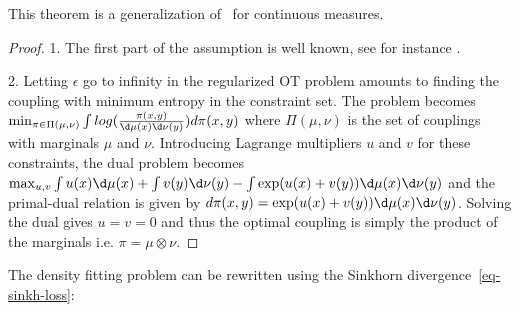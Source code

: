 \begin{rem}This theorem is a generalization of~\cite[\S3.3]{e19020047} for continuous measures. \end{rem}


\begin{proof}
1. The first part of the assumption is well known, see for instance \cite{Carlier2017}.

2. Letting $\epsilon$ go to infinity in the regularized OT problem amounts to finding the coupling with minimum entropy in the constraint set. The problem becomes $\min_{\pi \in \Pi(\mu,\nu)} \int log(\frac{\pi(x,y)}{\d\mu(x)\d\nu(y)})d\pi(x,y)$ where $\Pi(\mu,\nu)$ is the set of couplings with marginals $\mu$ and $\nu$. Introducing Lagrange multipliers $u$ and $v$ for these constraints, the dual problem becomes $\max_{u,v} \int u(x) \d\mu(x) + \int v(y) \d\nu(y) - \int \exp(u(x)+v(y))\d\mu(x) \d\nu(y)$ and the primal-dual relation is given by $d\pi(x,y) = \exp(u(x)+v(y))\d\mu(x) \d\nu(y)$. Solving the dual gives $u = v = 0$ and thus the optimal coupling is simply the product of the marginals i.e. $\pi = \mu \otimes \nu$.
\end{proof}

The density fitting problem can be rewritten using the Sinkhorn divergence~\eqref{eq-sinkh-loss}:

